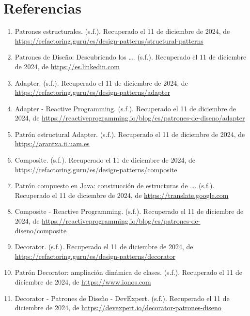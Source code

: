 \documentclass[12pt]{article}
\begin{document}
\section*{Referencias}
\begin{enumerate}
    \item Patrones estructurales. (s.f.). Recuperado el 11 de diciembre de 2024, de \url{https://refactoring.guru/es/design-patterns/structural-patterns}
    \item Patrones de Diseño: Descubriendo los …. (s.f.). Recuperado el 11 de diciembre de 2024, de \url{https://es.linkedin.com}
    \item Adapter. (s.f.). Recuperado el 11 de diciembre de 2024, de \url{https://refactoring.guru/es/design-patterns/adapter}
    \item Adapter - Reactive Programming. (s.f.). Recuperado el 11 de diciembre de 2024, de \url{https://reactiveprogramming.io/blog/es/patrones-de-diseno/adapter}
    \item Patrón estructural Adapter. (s.f.). Recuperado el 11 de diciembre de 2024, de \url{https://arantxa.ii.uam.es}
    \item Composite. (s.f.). Recuperado el 11 de diciembre de 2024, de \url{https://refactoring.guru/es/design-patterns/composite}
    \item Patrón compuesto en Java: construcción de estructuras de …. (s.f.). Recuperado el 11 de diciembre de 2024, de \url{https://translate.google.com}
    \item Composite - Reactive Programming. (s.f.). Recuperado el 11 de diciembre de 2024, de \url{https://reactiveprogramming.io/blog/es/patrones-de-diseno/composite}
    \item Decorator. (s.f.). Recuperado el 11 de diciembre de 2024, de \url{https://refactoring.guru/es/design-patterns/decorator}
    \item Patrón Decorator: ampliación dinámica de clases. (s.f.). Recuperado el 11 de diciembre de 2024, de \url{https://www.ionos.com}
    \item Decorator - Patrones de Diseño - DevExpert. (s.f.). Recuperado el 11 de diciembre de 2024, de \url{https://devexpert.io/decorator-patrones-diseno}
\end{enumerate}
\end{document}

